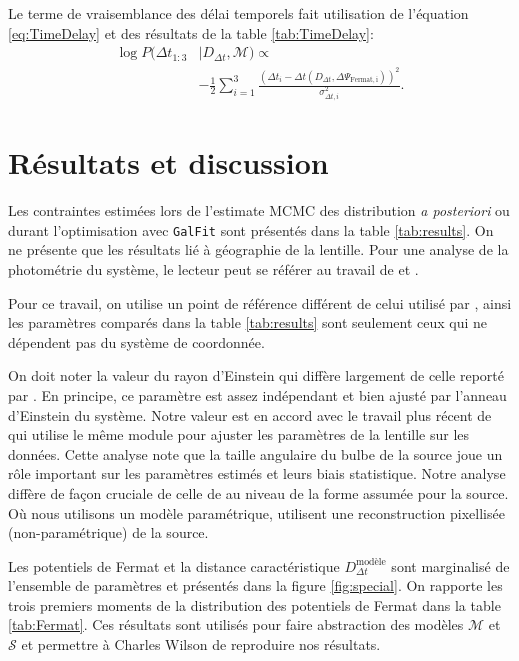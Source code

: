 \documentclass[times,10pt,twocolumn]{article}
\begin{document}
Le terme de vraisemblance des délai temporels fait utilisation de 
l'équation \eqref{eq:TimeDelay} et des résultats de la table 
\ref{tab:TimeDelay}:
\begin{align}
        \nonumber
        \log P(\Delta t_{1:3}&| D_{\Delta t}, \mathcal{M}) \propto  \\
        \label{eq:TimeDelayLike}
                       &-\frac{1}{2} \sum_{i=1}^{3} \frac{(\Delta t_i - 
        \Delta t(D_{\Delta t}, \Delta\Psi_{\mathrm{Fermat, i}}))^{2}}{\sigma_{\Delta t, i}^{2}}.
\end{align}

\section{Résultats et discussion}\label{sec:resultats}
Les contraintes estimées lors de l'estimate MCMC des distribution 
\textit{a posteriori} ou durant l'optimisation avec \texttt{GalFit} 
sont présentés dans la table \ref{tab:results}. On ne présente que 
les résultats lié à géographie de la lentille. Pour une 
analyse de la photométrie du système, le lecteur peut se référer au 
travail de \citet{Suyu2013} et \citet{Tewes2013}.

Pour ce travail, on utilise un point de référence différent de celui utilisé 
par \citet{Suyu2013}, ainsi les paramètres comparés dans la table \ref{tab:results} 
sont seulement ceux qui ne dépendent pas du système de coordonnée.

On doit noter la valeur du rayon d'Einstein qui diffère largement de celle 
reporté par \citet{Suyu2013}. En principe, ce paramètre est assez indépendant 
et bien ajusté par l'anneau d'Einstein du système. Notre valeur est en accord 
avec le travail plus récent de \citet{Birrer2016} qui utilise le même 
module pour ajuster les paramètres de la lentille sur les données. Cette analyse 
note que la taille angulaire du bulbe de la source joue un rôle important sur les 
paramètres estimés et leurs biais statistique. Notre analyse diffère de façon cruciale 
de celle 
de \citet{Suyu2013} au niveau de la forme assumée pour la source. Où nous utilisons 
un modèle paramétrique, \citet{Suyu2013} utilisent une reconstruction pixellisée 
(non-paramétrique) de la source. 

Les potentiels de Fermat et la distance caractéristique $D^{\text{modèle}}_{\Delta t}$ sont 
marginalisé de l'ensemble de paramètres et présentés dans la figure 
\ref{fig:special}. On rapporte les trois premiers moments de la distribution 
des potentiels de Fermat dans la table \ref{tab:Fermat}. Ces résultats 
sont utilisés pour faire abstraction des modèles $\mathcal{M}$ et $\mathcal{S}$ 
et permettre à Charles Wilson de reproduire nos résultats.
\end{document}
